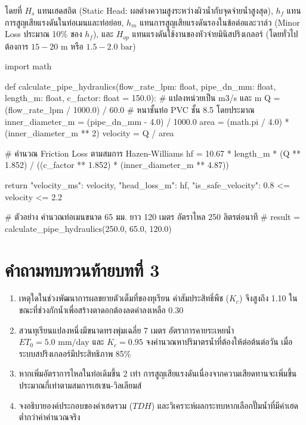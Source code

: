 โดยที่ $H_s$ แทนเฮดสถิต (Static Head: ผลต่างความสูงระหว่างผิวน้ำกับจุดจ่ายน้ำสูงสุด), $h_f$ แทนการสูญเสียแรงดันในท่อเมนและท่อย่อย, $h_m$ แทนการสูญเสียแรงดันรองในข้อต่อและวาล์ว (Minor Loss ประมาณ 10\% ของ $h_f$), และ $H_{op}$ แทนแรงดันใช้งานของหัวจ่ายมินิสปริงเกลอร์ (โดยทั่วไปต้องการ $15 - 20\text{ m}$ หรือ $1.5 - 2.0\text{ bar}$)

\begin{pythonbox}
import math

def calculate_pipe_hydraulics(flow_rate_lpm: float, pipe_dn_mm: float, length_m: float, c_factor: float = 150.0):
    # แปลงหน่วยเป็น m3/s และ m
    Q = (flow_rate_lpm / 1000.0) / 60.0
    # หนาชั้นท่อ PVC ชั้น 8.5 โดยประมาณ
    inner_diameter_m = (pipe_dn_mm - 4.0) / 1000.0
    area = (math.pi / 4.0) * (inner_diameter_m ** 2)
    velocity = Q / area
    
    # คำนวณ Friction Loss ตามสมการ Hazen-Williams
    hf = 10.67 * length_m * (Q ** 1.852) / ((c_factor ** 1.852) * (inner_diameter_m ** 4.87))
    
    return {
        "velocity_ms": velocity,
        "head_loss_m": hf,
        "is_safe_velocity": 0.8 <= velocity <= 2.2
    }

# ตัวอย่าง คำนวณท่อเมนขนาด 65 มม. ยาว 120 เมตร อัตราไหล 250 ลิตรต่อนาที
# result = calculate_pipe_hydraulics(250.0, 65.0, 120.0)
\end{pythonbox}

\section*{คำถามทบทวนท้ายบทที่ 3}

\begin{enumerate}
    \item เหตุใดในช่วงพัฒนาการผลขยายตัวเต็มที่ของทุเรียน ค่าสัมประสิทธิ์พืช ($K_c$) จึงสูงถึง 1.10 ในขณะที่ช่วงกักน้ำเพื่อสร้างตาดอกต้องลดค่าลงเหลือ 0.30
    \item สวนทุเรียนแปลงหนึ่งมีขนาดทรงพุ่มเฉลี่ย 7 เมตร อัตราการคายระเหยน้ำ $ET_0 = 5.0\text{ mm/day}$ และ $K_c = 0.95$ จงคำนวณหาปริมาตรน้ำที่ต้องให้ต่อต้นต่อวัน เมื่อระบบสปริงเกลอร์มีประสิทธิภาพ 85\%
    \item หากเพิ่มอัตราการไหลในท่อเดิมขึ้น 2 เท่า การสูญเสียแรงดันเนื่องจากความเสียดทานจะเพิ่มขึ้นประมาณกี่เท่าตามสมการเฮเซน-วิลเลียมส์
    \item จงอธิบายองค์ประกอบของค่าเฮดรวม ($TDH$) และวิเคราะห์ผลกระทบหากเลือกปั๊มน้ำที่มีค่าเฮดต่ำกว่าค่าคำนวณจริง
\end{enumerate}
\clearpage
